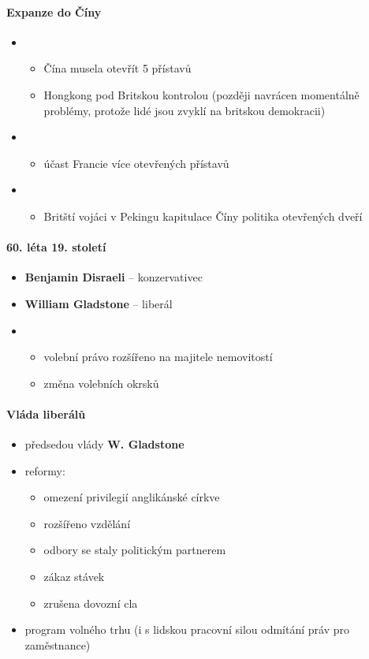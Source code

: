 \paragraph{Expanze do Číny}
\begin{itemize}
\item {}
\begin{itemize}
	\item Čína musela otevřít 5 přístavů 
	\item Hongkong pod Britskou kontrolou (\ra později navrácen \ra momentálně problémy, protože lidé jsou zvyklí na britskou demokracii)
\end{itemize}
\item {}
	\begin{itemize}
	\item účast Francie \ra více otevřených přístavů
	\end{itemize}
\item {} 
	\begin{itemize}
	\item Britští vojáci v Pekingu \ra kapitulace Číny \ra politika otevřených dveří
	\end{itemize}
\end{itemize}

\paragraph{60. léta 19. století}
\begin{itemize}
\item \textbf{Benjamin Disraeli} -- konzervativec
\item \textbf{William Gladstone} -- liberál
\item {}
	\begin{itemize}
	\item volební právo rozšířeno na majitele nemovitostí
	\item změna volebních okrsků
	\end{itemize}
\end{itemize}

\paragraph{Vláda liberálů}
\begin{itemize}
\item předsedou vlády \textbf{W. Gladstone}
\item reformy: 
	\begin{itemize}
	\item omezení privilegií anglikánské církve
	\item rozšířeno vzdělání
	\item odbory se staly politickým partnerem
	\item zákaz stávek
	\item zrušena dovozní cla
	\end{itemize}
\item program volného trhu (i s lidskou pracovní silou \ra odmítání práv pro zaměstnance)
\end{itemize}

